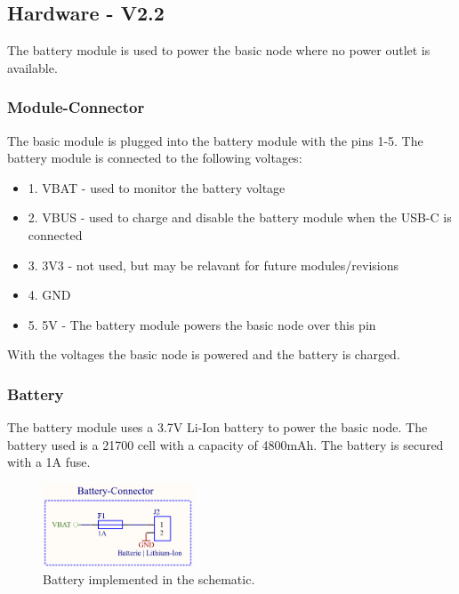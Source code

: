 \subsection{Hardware - V2.2}

    The battery module is used to power the basic node where no power outlet is available.

    \subsubsection{Module-Connector}
        The basic module is plugged into the battery module with the pins 1-5. 
        The battery module is connected to the following voltages:

        \begin{itemize}
            \item 1. VBAT - used to monitor the battery voltage
            \item 2. VBUS - used to charge and disable the battery module when the USB-C 
            is connected
            \item 3. 3V3 - not used, but may be relavant for future modules/revisions
            \item 4. GND
            \item 5. 5V - The battery module powers the basic node over this pin
        \end{itemize}
        
        With the voltages the basic node is powered and the battery is charged.


    \subsubsection{Battery}

        The battery module uses a 3.7V Li-Ion battery to power the basic node. The battery 
        used is a 21700 cell with a capacity of 4800mAh. The battery is secured with a 1A fuse.
 
        \begin{figure}[H]
            \centering
            \includegraphics[width=0.4\textwidth]{assets/HW/BatteryV2.2_Battery-Terminal.png}
            \caption{Battery implemented in the schematic.}
        \end{figure}

